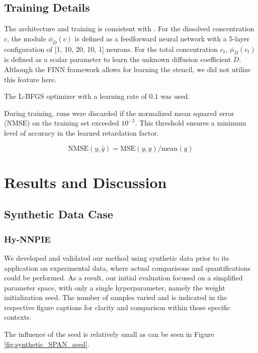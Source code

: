 \subsection{Training Details}
The architecture and training is consistent with \cite{finn}. For the dissolved concentration $c$, the module $\phi_D(c)$ is defined as a feedforward neural network with a 5-layer configuration of [1, 10, 20, 10, 1] neurons. For the total concentration $c_t$, $\phi_D(c_t)$ is defined as a scalar parameter to learn the unknown diffusion coefficient $D$. Although the FINN framework allows for learning the stencil, we did not utilize this feature here.

The L-BFGS optimizer \cite{malouf2002comparison} with a learning rate of $0.1$ was used.

During training, runs were discarded if the normalized mean squared error (NMSE) on the training set exceeded $10^{-5}$. This threshold ensures a minimum level of accuracy in the learned retardation factor.


\begin{equation*}
    \text{NMSE}(y, \hat{y}) = \text{MSE}(y, \hat{y}) / \text{mean}(y)
\end{equation*}




\section{Results and Discussion}

\subsection{Synthetic Data Case}
\subsubsection{Hy-NNPIE}
We developed and validated our method using synthetic data prior to its application on experimental data, where actual comparisons and quantifications could be performed. As a result, our initial evaluation focused on a simplified parameter space, with only a single hyperparameter, namely the weight initialization seed.
The number of samples varied and is indicated in the respective figure captions for clarity and comparison within those specific contexts. %

The influence of the seed is relatively small as can be seen in Figure \vref{fig:synthetic_SPAN_seed}.


